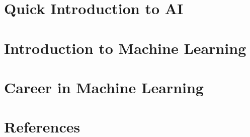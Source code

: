 \section[Intro ML]{Quick Introduction to AI}


\section[Intro ML]{Introduction to Machine Learning}


\section[Career]{Career in Machine Learning}


\section[Refs]{References}


